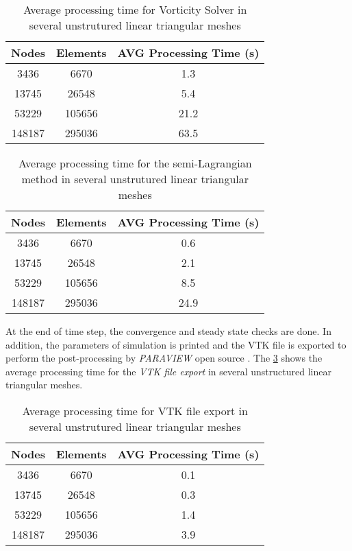 \vspace{0.5cm}
\begin{table}[H]
\centering
\begin{tabular}{ccc}
\toprule
\textbf{Nodes} & \textbf{Elements} & \textbf{AVG Processing Time} (s) \\
\midrule
3436 & 6670 & 1.3 \\
13745 & 26548 & 5.4 \\
53229 & 105656 & 21.2 \\
148187 & 295036 & 63.5 \\



\bottomrule
\end{tabular}
\caption{Average processing time for Vorticity Solver in several unstrutured linear triangular meshes}
\label{tempo vorticity solver}
\end{table}


\vspace{0.5cm}
\begin{table}[H]
\centering
\begin{tabular}{ccc}
\toprule
\textbf{Nodes} & \textbf{Elements} & \textbf{AVG Processing Time} (s) \\
\midrule
3436 & 6670 & 0.6 \\
13745 & 26548 & 2.1 \\
53229 & 105656 & 8.5 \\
148187 & 295036 & 24.9 \\



\bottomrule
\end{tabular}
\caption{Average processing time for the semi-Lagrangian method in several unstrutured linear triangular meshes}
\label{tempo semi lagrangian}
\end{table}


\medskip
At the end of time step, the convergence and steady state checks are done.
In addition, the parameters of simulation is printed and
the VTK file is exported to perform the post-processing by
\textit{PARAVIEW} open source \cite{paraview}. 
The \ref{tempo export vtk} 
shows the average processing time for the \textit{VTK file export}
in several unstructured linear triangular meshes.

\vspace{0.5cm}
\begin{table}[H]
\centering
\begin{tabular}{ccc}
\toprule
\textbf{Nodes} & \textbf{Elements} & \textbf{AVG Processing Time} (s) \\
\midrule
3436 & 6670 & 0.1 \\
13745 & 26548 & 0.3 \\
53229 & 105656 & 1.4 \\
148187 & 295036 & 3.9 \\



\bottomrule
\end{tabular}
\caption{Average processing time for VTK file export in several unstrutured linear triangular meshes}
\label{tempo export vtk}
\end{table}

